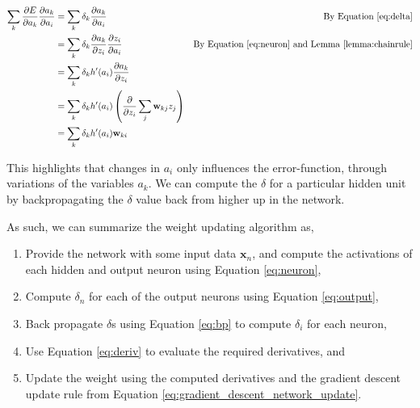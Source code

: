 \begin{align}
    \sum_k \frac{\partial E}{\partial a_k} \frac{\partial a_k}{\partial a_i}
    &= \sum_k \delta_k \frac{\partial a_k}{\partial a_i}
    & \text{By Equation \eqref{eq:delta}}
    \\
    &= \sum_k \delta_k \frac{\partial a_k}{\partial z_i}
        \frac{\partial z_i}{\partial a_i}
    & \text{By Equation \eqref{eq:neuron} and Lemma \ref{lemma:chainrule}}
    \\
    &= \sum_k \delta_k h'(a_i) \frac{\partial a_k}{\partial z_i}
    \\
    &= \sum_k \delta_k h'(a_i) \left( \frac{\partial}{\partial z_i}
        \sum_{j} \mathbf{w}_{kj} z_j\right)
    \\
    &= \sum_k \delta_k h'(a_i) \mathbf{w}_{ki}
    \\
\end{align}

This highlights that changes in $a_i$ only influences the error-function,
through variations of the variables $a_k$. We can compute the $\delta$ for a
particular hidden unit by backpropagating the $\delta$ value back from higher up
in the network.

As such, we can summarize the weight updating algorithm as,

\begin{enumerate}
    \item

        Provide the network with some input data $\mathbf{x}_n$, and compute the
        activations of each hidden and output neuron using Equation
        \eqref{eq:neuron},

    \item

        Compute $\delta_n$ for each of the output neurons using Equation
        \eqref{eq:output},

    \item

        Back propagate $\delta$s using Equation \eqref{eq:bp} to compute
        $\delta_i$ for each neuron,

    \item

        Use Equation \eqref{eq:deriv} to evaluate the required derivatives, and

    \item

        Update the weight using the computed derivatives
        and the gradient descent update rule from Equation
        \eqref{eq:gradient_descent_network_update}.

\end{enumerate}

